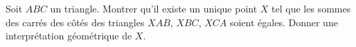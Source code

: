 Soit $ABC$ un triangle. Montrer qu'il existe un unique point $X$ tel que les sommes des carrés des côtés des triangles $XAB$, $XBC$, $XCA$ soient égales. Donner une interprétation géométrique de $X$.
